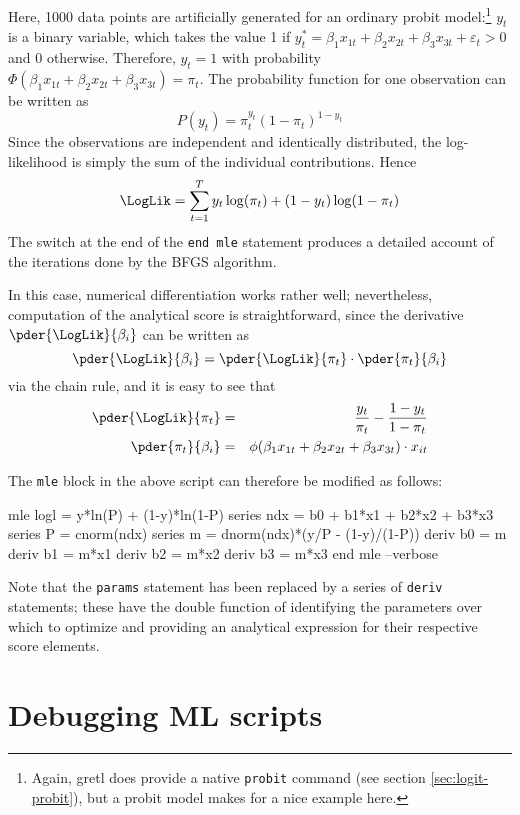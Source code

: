 Here, 1000 data points are artificially generated for an ordinary
probit model:\footnote{Again, gretl does provide a native
  \texttt{probit} command (see section \ref{sec:logit-probit}), but a
  probit model makes for a nice example here.} $y_t$ is a binary
variable, which takes the value 1 if $y_t^* = \beta_1 x_{1t} + \beta_2
x_{2t} + \beta_3 x_{3t} + \varepsilon_t > 0$ and 0 otherwise.
Therefore, $y_t = 1$ with probability $\Phi(\beta_1 x_{1t} + \beta_2
x_{2t} + \beta_3 x_{3t}) = \pi_t$.  The probability function for one
observation can be written as
\[
  P(y_t) = \pi_t^{y_t} ( 1 -\pi_t )^{1-y_t}
\]
Since the observations are independent and identically distributed,
the log-likelihood is simply the sum of the individual
contributions. Hence
\[
  \LogLik = \sum_{t=1}^T y_t \log(\pi_t) + (1 - y_t) \log(1 - \pi_t)
\]
The  switch at the end of the \texttt{end mle}
statement produces a detailed account of the iterations done by the
BFGS algorithm.

In this case, numerical differentiation works rather well;
nevertheless, computation of the analytical score is straightforward,
since the derivative $\pder{\LogLik}{\beta_i}$ can be written as
\[
  \pder{\LogLik}{\beta_i} = \pder{\LogLik}{\pi_t} \cdot \pder{\pi_t}{\beta_i}
\]
via the chain rule, and it is easy to see that
\begin{eqnarray*}
  \pder{\LogLik}{\pi_t} & = & \frac{y_t}{\pi_t} - \frac{1 - y_t}{1 -
    \pi_t} \\
  \pder{\pi_t}{\beta_i} & = & \phi(\beta_1 x_{1t} + \beta_2 x_{2t} +
  \beta_3 x_{3t}) \cdot x_{it}
\end{eqnarray*}

The \texttt{mle} block in the above script can therefore be modified
as follows:
%
\begin{code}
mle logl = y*ln(P) + (1-y)*ln(1-P)
  series ndx = b0 + b1*x1 + b2*x2 + b3*x3
  series P = cnorm(ndx)
  series m = dnorm(ndx)*(y/P - (1-y)/(1-P))
  deriv b0 = m
  deriv b1 = m*x1
  deriv b2 = m*x2
  deriv b3 = m*x3
end mle --verbose
\end{code}

Note that the \texttt{params} statement has been replaced by a series
of \texttt{deriv} statements; these have the double function of
identifying the parameters over which to optimize and providing an
analytical expression for their respective score elements.

\section{Debugging ML scripts}
\label{sec:mle-debug}

